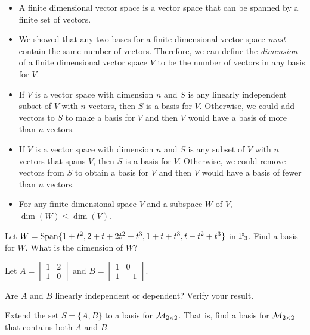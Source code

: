\begin{itemize}
\item A finite dimensional vector space is a vector space that can be spanned by a finite set of vectors.
\item We showed that any two bases for a finite dimensional vector space \emph{must} contain the same number of vectors. Therefore, we can define the \emph{dimension} of a finite dimensional vector space $V$ to be the number of vectors in any basis for $V$.
\item If $V$ is a vector space with dimension $n$ and $S$ is any linearly independent subset of $V$ with $n$ vectors, then $S$ is a basis for $V$. Otherwise, we could add vectors to $S$ to make a basis for $V$ and then $V$ would have a basis of more than $n$ vectors. 
\item If $V$ is a vector space with dimension $n$ and $S$ is any subset of $V$ with $n$ vectors that spans $V$, then $S$ is a basis for $V$. Otherwise, we could remove vectors from $S$ to obtain a basis for $V$ and then $V$ would have a basis of fewer than $n$ vectors. 
\item For any finite dimensional space $V$ and a subspace $W$ of $V$, $\dim(W)\leq \dim(V)$.
\end{itemize}

\be


\item Let $W = \text{Span}\{ 1+t^2, 2+t+2t^2+t^3, 1+t+t^3, t-t^2+t^3\}$ in $\mathbb{P}_3$. Find a basis for $W$. What is the dimension of $W$?

\item Let $A = \left[ \begin{array}{cc} 1&2\\1&0 \end{array} \right]$ and $B = \left[ \begin{array}{cr} 1&0\\1&-1 \end{array} \right]$.
	\ba
	\item Are $A$ and $B$ linearly independent or dependent? Verify your result.
	\item Extend the set $S = \{A,B\}$ to a basis for $\mathcal{M}_{2 \times 2}$. That is, find a basis for $\mathcal{M}_{2 \times 2}$ that contains both $A$ and $B$. 
	\ea
	
